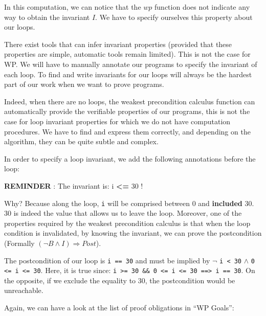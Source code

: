 In this computation, we can notice that the $wp$ function does not
indicate any way to obtain the invariant $I$. We have to specify
ourselves this property about our loops.





There exist tools that can infer invariant properties (provided that
these properties are simple, automatic tools remain limited). This is not
the case for WP. We will have to manually annotate our programs to
specify the invariant of each loop. To find and write invariants for our
loops will always be the hardest part of our work when we want to prove
programs.



Indeed, when there are no loops, the weakest precondition calculus
function can automatically provide the verifiable properties of our
programs, this is not the case for loop invariant properties for which we
do not have computation procedures. We have to find and express them
correctly, and depending on the algorithm, they can be quite subtle and
complex.



In order to specify a loop invariant, we add the following annotations
before the loop:






\begin{Warning}
  \textbf{REMINDER} : The invariant is: i \textbf{<=} 30 !
\end{Warning}


Why? Because along the loop, \texttt{i} will be comprised between 0 and
\textbf{included} 30. 30 is indeed the value that allows us to leave the
loop. Moreover, one of the properties required by the weakest
precondition calculus is that when the loop condition is invalidated, by
knowing the invariant, we can prove the postcondition (Formally
$(\neg B \wedge I) \Rightarrow Post$).

The postcondition of our loop is \texttt{i == 30} and must be implied
by $\neg$ \texttt{i < 30} $\wedge$
\texttt{0 <= i <= 30}. Here, it is true since:
\texttt{i >= 30 \&\& 0 <= i <= 30 ==> i == 30}.
On the opposite, if we exclude the equality to 30, the postcondition
would be unreachable.



Again, we can have a look at the list of proof obligations in ``WP
Goals'':




